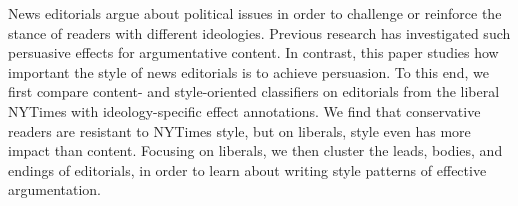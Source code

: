 News editorials argue about political issues in order to challenge or reinforce the stance of readers with different ideologies. Previous research has investigated such persuasive effects for argumentative content. In contrast, this paper studies how important the style of news editorials is to achieve persuasion. To this end, we first compare content- and style-oriented classifiers on editorials from the liberal NYTimes with ideology-specific effect annotations. We find that conservative readers are resistant to NYTimes style, but on liberals, style even has more impact than content. Focusing on liberals, we then cluster the leads, bodies, and endings of editorials, in order to learn about writing style patterns of effective argumentation.
